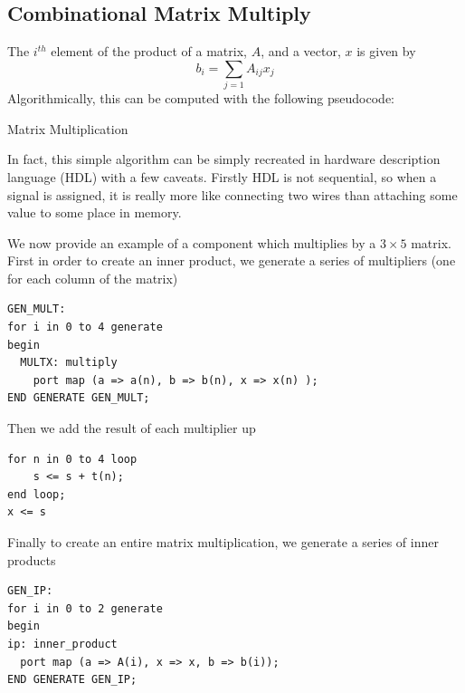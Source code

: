 \subsection{Combinational Matrix Multiply}
The $i^{th}$ element of the product of a matrix, $A$, and a vector, $x$ is given by
$$b_i = \sum_{j=1} A_{ij}x_j$$
Algorithmically, this can be computed with the following pseudocode:

\begin{spacing}{1.0}
\begin{algorithm}
\begin{algorithmic}[1]
    \caption{Matrix Multiplication}
        \EndFor
    \EndFor
\end{algorithmic}
\end{algorithm}
\label{alg:matmul}
\end{spacing}

In fact, this simple algorithm can be simply recreated in hardware description language (HDL) with a few caveats.  Firstly HDL is not sequential, so when a signal is assigned, it is really more like connecting two wires than attaching some value to some place in memory.  

We now provide an example of a component which multiplies by a $3\times5$ matrix.  First in order to create an inner product, we generate a series of multipliers (one for each column of the matrix)

\begin{spacing}{1.0}
\begin{verbatim}
GEN_MULT:
for i in 0 to 4 generate
begin
  MULTX: multiply
    port map (a => a(n), b => b(n), x => x(n) );
END GENERATE GEN_MULT;
\end{verbatim}
\end{spacing}

Then we add the result of each multiplier up
\begin{spacing}{1.0} \begin{verbatim}
for n in 0 to 4 loop
    s <= s + t(n);
end loop;
x <= s
\end{verbatim} \end{spacing}

Finally to create an entire matrix multiplication, we generate a series of inner products

\begin{spacing}{1.0} \begin{verbatim}
GEN_IP: 
for i in 0 to 2 generate
begin
ip: inner_product
  port map (a => A(i), x => x, b => b(i));
END GENERATE GEN_IP;
\end{verbatim} \end{spacing}

